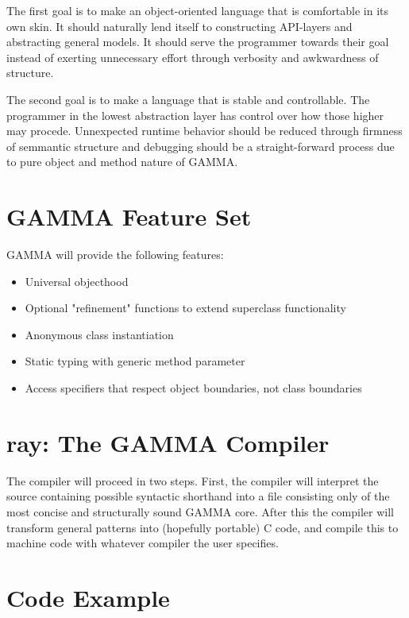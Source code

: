 \documentclass[10pt]{article}
\newcommand{\Lang}{GAMMA}
\newcommand{\Compiler}{ray}
\begin{document}
The first goal is to make an object-oriented language that is comfortable in its own skin. It should naturally lend itself to constructing API-layers and abstracting general models. It should serve the programmer towards their goal instead of exerting unnecessary effort through verbosity and awkwardness of structure.


The second goal is to make a language that is stable and controllable. The programmer in the lowest abstraction layer has control over how those higher may procede. Unnexpected runtime behavior should be reduced through firmness of semmantic structure and debugging should be a straight-forward process due to pure object and method nature of \Lang{}.

\section*{\Lang{} Feature Set}

\Lang{} will provide the following features:

\begin{itemize}
\item Universal objecthood
\item Optional "refinement" functions to extend superclass functionality
\item Anonymous class instantiation
\item Static typing with generic method parameter
\item Access specifiers that respect object boundaries, not class boundaries
\end{itemize}

\section*{\Compiler{}: The \Lang{} Compiler}

The compiler will proceed in two steps. First, the compiler will interpret
the source containing possible syntactic shorthand into a file
consisting only of the most concise and structurally sound GAMMA core. After this the compiler will transform
general patterns into (hopefully portable) C code, and compile this to
machine code with whatever compiler the user specifies.

\section*{Code Example}
\end{document}
